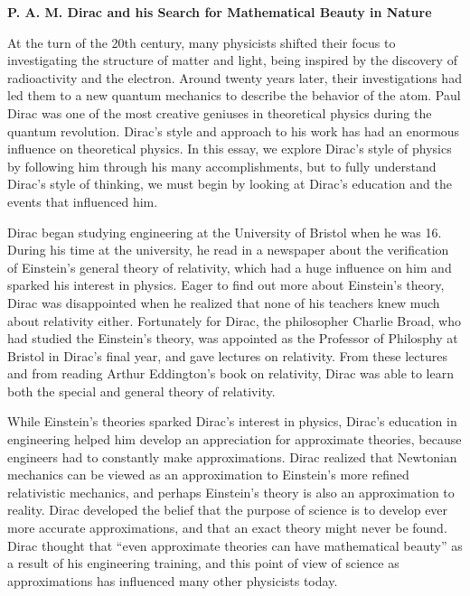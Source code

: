 \documentclass[12pt, oneside, letterpaper, fleqn]{article}
\begin{document}
\begin{center}
\textbf{P. A. M. Dirac and his Search for Mathematical Beauty in Nature}
\end{center}

At the turn of the 20th century, many physicists shifted their focus to
investigating the structure of matter and light, being inspired by the
discovery of radioactivity and the electron. Around twenty years later,
their investigations had led them to a new quantum mechanics to describe
the behavior of the atom.  Paul Dirac was one of the most creative
geniuses in theoretical physics during the quantum revolution. Dirac's
style and approach to his work has had an enormous influence on
theoretical physics. In this essay, we explore Dirac's style of physics
by following him through his many accomplishments, but to fully
understand Dirac's style of thinking, we must begin by looking at
Dirac's education and the events that influenced him.

Dirac began studying engineering at the University of Bristol when he
was 16. During his time at the university, he read in a newspaper about
the verification of Einstein's general theory of relativity, which had a
huge influence on him and sparked his interest in physics. Eager to find
out more about Einstein's theory, Dirac was disappointed when he
realized that none of his teachers knew much about relativity either.
Fortunately for Dirac, the philosopher Charlie Broad, who had studied
the Einstein's theory, was appointed as the Professor of Philosphy at
Bristol in Dirac's final year, and gave lectures on relativity. From
these lectures and from reading Arthur Eddington's book on relativity,
Dirac was able to learn both the special and general theory of
relativity.

While Einstein's theories sparked Dirac's interest in physics, Dirac's
education in engineering helped him develop an appreciation for
approximate theories, because engineers had to constantly make
approximations. Dirac realized that Newtonian mechanics can be viewed as
an approximation to Einstein's more refined relativistic mechanics, and
perhaps Einstein's theory is also an approximation to reality. Dirac
developed the belief that the purpose of science is to develop ever more
accurate approximations, and that an exact theory might never be found.
Dirac thought that ``even approximate theories can have mathematical
beauty'' \cite[pg. 45]{strangest_man} as a result of his engineering
training, and this point of view of science as approximations has
influenced many other physicists today.
\end{document}
